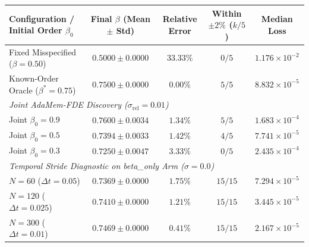 \begin{tabular}{lcccc}
\toprule
\textbf{Configuration / Initial Order $\beta_0$} & \textbf{Final $\beta$ (Mean $\pm$ Std)} & \textbf{Relative Error} & \textbf{Within $\pm 2\%$ ($k/5$)} & \textbf{Median Loss} \\
\midrule
Fixed Misspecified ($\beta = 0.50$) & $0.5000 \pm 0.0000$ & $33.33\%$ & $0/5$ & $1.176 \times 10^{-2}$ \\
Known-Order Oracle ($\beta^* = 0.75$) & $0.7500 \pm 0.0000$ & $0.00\%$ & $5/5$ & $8.832 \times 10^{-5}$ \\
\midrule
\multicolumn{5}{l}{\textit{Joint AdaMem-FDE Discovery ($\sigma_{\mathrm{rel}} = 0.01$)}} \\
Joint $\beta_0 = 0.9$ & $0.7600 \pm 0.0034$ & $1.34\%$ & $5/5$ & $1.683 \times 10^{-4}$ \\
Joint $\beta_0 = 0.5$ & $0.7394 \pm 0.0033$ & $1.42\%$ & $4/5$ & $7.741 \times 10^{-5}$ \\
Joint $\beta_0 = 0.3$ & $0.7250 \pm 0.0047$ & $3.33\%$ & $0/5$ & $2.435 \times 10^{-4}$ \\
\midrule
\multicolumn{5}{l}{\textit{Temporal Stride Diagnostic on beta\_only Arm ($\sigma = 0.0$)}} \\
$N = 60$ ($\Delta t = 0.05$) & $0.7369 \pm 0.0000$ & $1.75\%$ & $15/15$ & $7.294 \times 10^{-5}$ \\
$N = 120$ ($\Delta t = 0.025$) & $0.7410 \pm 0.0000$ & $1.21\%$ & $15/15$ & $3.445 \times 10^{-5}$ \\
$N = 300$ ($\Delta t = 0.01$) & $0.7469 \pm 0.0000$ & $0.41\%$ & $15/15$ & $2.167 \times 10^{-5}$ \\
\bottomrule
\end{tabular}